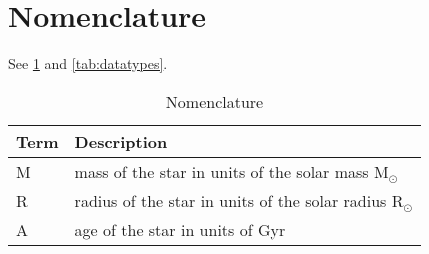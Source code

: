 \documentclass[a4paper, oneside, 11pt, article, english]{memoir}
\begin{document}


\section{Nomenclature}
\label{sec:nomenclature}


See \ref{tab:nomenclature} and \ref{tab:datatypes}.

\begin{table}[htbp]
  \centering
  \caption{Nomenclature}
  \label{tab:nomenclature}
  \begin{tabular}{@{}lp{9cm}@{}}
    \toprule
    Term                & Description                                                                                                                                                                                                                                                                                                                                                     \\
    \midrule
    M & mass of the star in units of the solar mass M$_\odot$ \\
    R & radius of the star in units of the solar radius R$_\odot$ \\
    A & age of the star in units of Gyr \\

\end{tabular}
\end{table}
\end{document}
